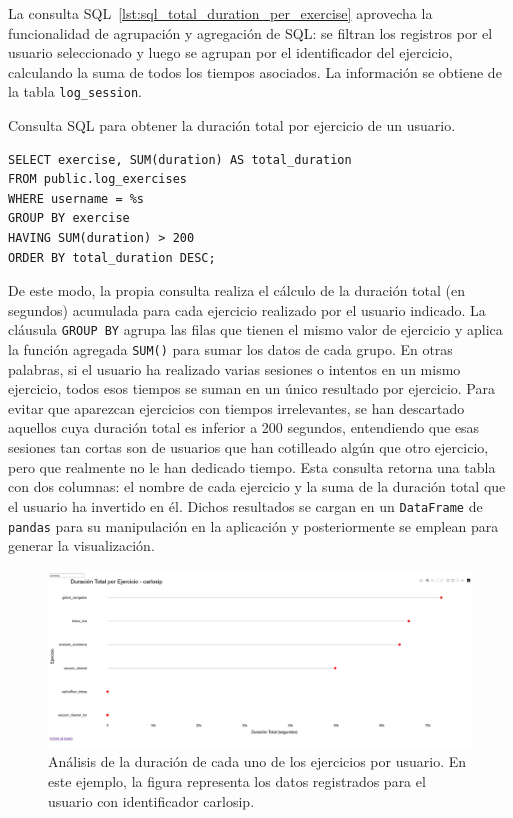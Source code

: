 \documentclass[a4paper, 12pt]{book}
\begin{document}
La consulta SQL~\ref{lst:sql_total_duration_per_exercise} aprovecha la funcionalidad de agrupación y agregación de SQL: se filtran los registros por el usuario seleccionado y luego se agrupan por el identificador del ejercicio, calculando la suma de todos los tiempos asociados. La información se obtiene de la tabla \texttt{log\_session}.

\begin{listing}[h!]
\caption{Consulta SQL para obtener la duración total por ejercicio de un usuario.}
\label{lst:sql_total_duration_per_exercise}
\begin{verbatim}
SELECT exercise, SUM(duration) AS total_duration
FROM public.log_exercises
WHERE username = %s
GROUP BY exercise
HAVING SUM(duration) > 200
ORDER BY total_duration DESC;
\end{verbatim}
\end{listing}

De este modo, la propia consulta realiza el cálculo de la duración total (en segundos) acumulada para cada ejercicio realizado por el usuario indicado. La cláusula \texttt{GROUP BY} agrupa las filas que tienen el mismo valor de ejercicio y aplica la función agregada \texttt{SUM()} para sumar los datos de cada grupo. En otras palabras, si el usuario ha realizado varias sesiones o intentos en un mismo ejercicio, todos esos tiempos se suman en un único resultado por ejercicio. Para evitar que aparezcan ejercicios con tiempos irrelevantes, se han descartado aquellos cuya duración total es inferior a 200 segundos, entendiendo que esas sesiones tan cortas son de usuarios que han cotilleado algún que otro ejercicio, pero que realmente no le han dedicado tiempo. Esta consulta retorna una tabla con dos columnas: el nombre de cada ejercicio y la suma de la duración total que el usuario ha invertido en él. Dichos resultados se cargan en un \texttt{DataFrame} de \texttt{pandas} para su manipulación en la aplicación y posteriormente se emplean para generar la visualización.

\begin{figure}[H]
  \centering
  \includegraphics[width=1.1\textwidth]{img/1a.png}
  \caption{Análisis de la duración de cada uno de los ejercicios por usuario. En este ejemplo, la figura representa los datos registrados para el usuario con identificador carlosip.}
  \label{fig:1a}
\end{figure}
\end{document}
